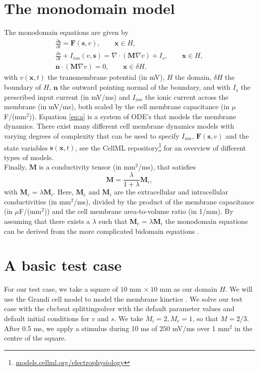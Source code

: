\documentclass[12pt,a4paper]{article}
\begin{document}
 
\section{The monodomain model} \label{The monodomain model}
The monodomain equations are given by 
\begin{eqnarray} \label{eq:a}
\frac{\partial \mathbf{s}}{\partial t}= \mathbf{F}(\mathbf{s},v), \qquad \mathbf{x} \in H, \\
\frac{\partial v}{\partial t} + I_{ion}(v,\mathbf{s}) =\nabla \label{eq:b} \cdot(\mathbf{M}\nabla v) + I_s,\qquad \mathbf{x} \in H, \\ \label{eq:c}
\mathbf{n}\cdot (\mathbf{M}\nabla v)=0, \qquad \mathbf{x} \in \delta H,
\end{eqnarray}
with $v(\mathbf{x},t)$ the transmembrane potential (in mV), $H$ the domain, $\delta H$ the boundary of $H$, $\mathbf{n}$ the outward pointing normal of the boundary, and with $I_s$ the prescribed input current (in mV/ms) and $I_{ion}$ the ionic current across the membrane (in mV/ms), both scaled by the cell membrane capacitance (in $\mu$F/(mm$^2$)). 
Equation \eqref{eq:a} is a system of ODE's that models the membrane dynamics. There exist many different cell membrane dynamics models with varying degrees of complexity that can be used to specify $I_{ion}$, $\mathbf{F}(\mathbf{s},v)$ and the state variables $\mathbf{s}(\mathbf{x},t)$, see the CellML repository\footnote{\url{models.cellml.org/electrophysiology}} for an overview of different types of models. \\ Finally, $\mathbf{M}$ is a conductivity tensor (in mm$^2$/ms), that satisfies 
\begin{equation}
\mathbf{M}=\frac{\lambda}{1+\lambda}\mathbf{M}_i,\label{eq:d}
\end{equation}
with $\mathbf{M}_e=\lambda \mathbf{M}_i$. Here, $\mathbf{M}_e$ and $\mathbf{M}_i$ are the extracellular and intracellular conductivities (in mm$^2$/ms), divided by the product of the membrane capacitance (in $\mu$F/(mm$^2$)) and the cell membrane area-to-volume ratio (in 1/mm). By assuming that there exists a $\lambda$ such that $\mathbf{M}_e=\lambda \mathbf{M}_i$ the monodomain equations can be derived from the more complicated bidomain equations \cite{Sundnes}.

\section{A basic test case} \label{A basic test case}
For our test case, we take a square of $10$ mm $\times\: 10$ mm as our domain $H$. We will use the Grandi cell model to model the membrane kinetics \cite{Grandi}. We solve our test case with the cbcbeat splittingsolver with the default parameter values and default initial conditions for $v$ and $s$. We take $M_i=2, M_e=1$, so that $M=2/3$. After 0.5 ms, we apply a stimulus during 10 ms of $250$ mV/ms over 1 mm$^2$ in the centre of the square. 
\end{document}
